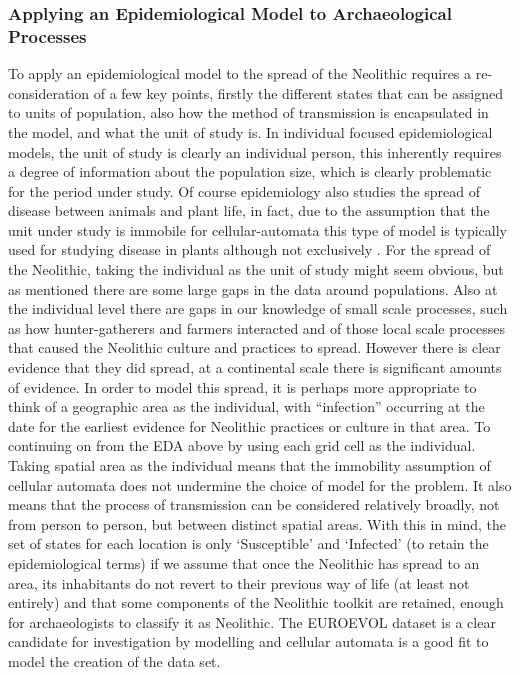 \subsubsection{Applying an Epidemiological Model to Archaeological Processes}
To apply an epidemiological model to the spread of the Neolithic requires a re-consideration of a few key points, firstly the different states that can be assigned to units of population, also how the method of transmission is encapsulated in the model, and what the unit of study is. In individual focused epidemiological models, the unit of study is clearly an individual person, this inherently requires a degree of information about the population size, which is clearly problematic for the period under study. Of course epidemiology also studies the spread of disease between animals and plant life, in fact, due to the assumption that the unit under study is immobile for cellular-automata this type of model is typically used for studying disease in plants \citep[6]{doi:10.1111/j.1467-9671.2012.01329.x} although not exclusively \citep[e.g.][]{Yang:2017fk}. For the spread of the Neolithic, taking the individual as the unit of study might seem obvious, but as mentioned there are some large gaps in the data around populations. Also at the individual level there are gaps in our knowledge of small scale processes, such as how hunter-gatherers and farmers interacted and of those local scale processes that caused the Neolithic culture and practices to spread. However there is clear evidence that they did spread, at a continental scale there is significant amounts of evidence. In order to model this spread, it is perhaps more appropriate to think of a geographic area as the individual, with ``infection'' occurring at the date for the earliest evidence for Neolithic practices or culture in that area. To continuing on from the EDA above by using each grid cell as the individual. Taking spatial area as the individual means that the immobility assumption of cellular automata does not undermine the choice of model for the problem. It also means that the process of transmission can be considered relatively broadly, not from person to person, but between distinct spatial areas. With this in mind, the set of states for each location is only `Susceptible' and `Infected' (to retain the epidemiological terms) if we assume that once the Neolithic has spread to an area, its inhabitants do not revert to their previous way of life (at least not entirely) and that some components of the Neolithic toolkit are retained, enough for archaeologists to classify it as Neolithic. The EUROEVOL dataset is a clear candidate for investigation by modelling and cellular automata is a good fit to model the creation of the data set.

